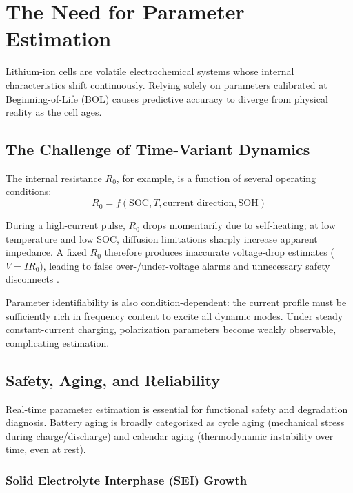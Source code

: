\section{The Need for Parameter Estimation}
\label{sec:need_parameter_estimation}

Lithium-ion cells are volatile electrochemical systems whose internal characteristics shift continuously. Relying solely on parameters calibrated at Beginning-of-Life (BOL) causes predictive accuracy to diverge from physical reality as the cell ages.

\subsection{The Challenge of Time-Variant Dynamics}

The internal resistance $R_0$, for example, is a function of several operating conditions:
\begin{equation}
R_0 = f(\text{SOC}, T, \text{current direction}, \text{SOH})
\end{equation}

During a high-current pulse, $R_0$ drops momentarily due to self-heating; at low temperature and low SOC, diffusion limitations sharply increase apparent impedance. A fixed $R_0$ therefore produces inaccurate voltage-drop estimates ($V = I R_0$), leading to false over-/under-voltage alarms and unnecessary safety disconnects \cite{hu2012comparative}.

Parameter identifiability is also condition-dependent: the current profile must be sufficiently rich in frequency content to excite all dynamic modes. Under steady constant-current charging, polarization parameters become weakly observable, complicating estimation.

\subsection{Safety, Aging, and Reliability}
\label{subsec:safety_aging}

Real-time parameter estimation is essential for functional safety and degradation diagnosis. Battery aging is broadly categorized as cycle aging (mechanical stress during charge/discharge) and calendar aging (thermodynamic instability over time, even at rest).

\subsubsection{Solid Electrolyte Interphase (SEI) Growth}

